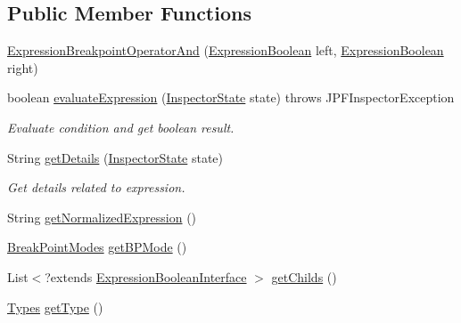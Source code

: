 \subsection*{Public Member Functions}
\begin{DoxyCompactItemize}
\item 
\hyperlink{classgov_1_1nasa_1_1jpf_1_1inspector_1_1server_1_1expression_1_1expressions_1_1_expression_breakpoint_operator_and_a2d3354f2f32c9b5f75f6e54eb5f4ffa4}{Expression\+Breakpoint\+Operator\+And} (\hyperlink{classgov_1_1nasa_1_1jpf_1_1inspector_1_1server_1_1expression_1_1_expression_boolean}{Expression\+Boolean} left, \hyperlink{classgov_1_1nasa_1_1jpf_1_1inspector_1_1server_1_1expression_1_1_expression_boolean}{Expression\+Boolean} right)
\item 
boolean \hyperlink{classgov_1_1nasa_1_1jpf_1_1inspector_1_1server_1_1expression_1_1expressions_1_1_expression_breakpoint_operator_and_a8040b6c9aeba20bf73330787627ec5d1}{evaluate\+Expression} (\hyperlink{interfacegov_1_1nasa_1_1jpf_1_1inspector_1_1server_1_1expression_1_1_inspector_state}{Inspector\+State} state)  throws J\+P\+F\+Inspector\+Exception 
\begin{DoxyCompactList}\small\item\em Evaluate condition and get boolean result. \end{DoxyCompactList}\item 
String \hyperlink{classgov_1_1nasa_1_1jpf_1_1inspector_1_1server_1_1expression_1_1expressions_1_1_expression_breakpoint_operator_and_a33f6168cec296efd3530512c7ca2d4b6}{get\+Details} (\hyperlink{interfacegov_1_1nasa_1_1jpf_1_1inspector_1_1server_1_1expression_1_1_inspector_state}{Inspector\+State} state)
\begin{DoxyCompactList}\small\item\em Get details related to expression. \end{DoxyCompactList}\item 
String \hyperlink{classgov_1_1nasa_1_1jpf_1_1inspector_1_1server_1_1expression_1_1expressions_1_1_expression_breakpoint_operator_and_ac2c32d855b87e0036674e0c3e7911392}{get\+Normalized\+Expression} ()
\item 
\hyperlink{enumgov_1_1nasa_1_1jpf_1_1inspector_1_1server_1_1breakpoints_1_1_break_point_modes}{Break\+Point\+Modes} \hyperlink{classgov_1_1nasa_1_1jpf_1_1inspector_1_1server_1_1expression_1_1_expression_boolean_binary_operator_a7ef59a2108ddded0cc7094ae1e3086d7}{get\+B\+P\+Mode} ()
\item 
List$<$?extends \hyperlink{interfacegov_1_1nasa_1_1jpf_1_1inspector_1_1server_1_1expression_1_1_expression_boolean_interface}{Expression\+Boolean\+Interface} $>$ \hyperlink{classgov_1_1nasa_1_1jpf_1_1inspector_1_1server_1_1expression_1_1_expression_boolean_binary_operator_a8cf5fe32bcd0cd345799ea65905beac3}{get\+Childs} ()
\item 
\hyperlink{enumgov_1_1nasa_1_1jpf_1_1inspector_1_1server_1_1expression_1_1_types}{Types} \hyperlink{classgov_1_1nasa_1_1jpf_1_1inspector_1_1server_1_1expression_1_1_expression_boolean_aed010ff8683eb1e8621e226703133457}{get\+Type} ()
\end{DoxyCompactItemize}
